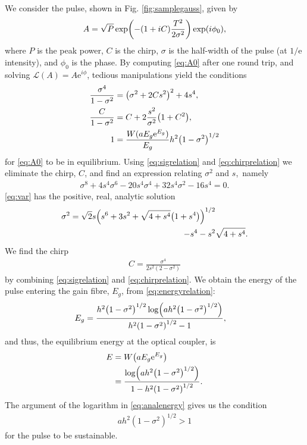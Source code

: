 \documentclass[9pt,twocolumn,twoside]{osajnl}
\let\originalleft\left
\let\originalright\right
\renewcommand{\left}{\mathopen{}\mathclose\bgroup\originalleft}
\renewcommand{\right}{\aftergroup\egroup\originalright}
\begin{document}
We consider the pulse, shown in Fig. \ref{fig:samplegauss}, given by
\begin{align}
	A = \sqrt{P} \exp \left( -(1 + iC) \frac{T^2}{2 \sigma^2} \right) \exp(i \phi_0),
	\label{eq:A0}
\end{align}
where $P$ is the peak power, $C$ is the chirp, $\sigma$ is the half-width of the pulse (at $1 / \textrm{e}$ intensity), and $\phi_0$ is the phase. By computing \eqref{eq:A0} after one round trip, and solving $\mathcal{L}(A) = A \textrm{e}^{i \phi}$, tedious manipulations yield the conditions
\begin{align}
	\frac{\sigma^4}{1 - \sigma^2} &= \left( \sigma^2 + 2 C s^2 \right)^2 + 4 s^4, \label{eq:sigrelation} \\
	\frac{C}{1 - \sigma^2} &= C + 2 \frac{s^2}{\sigma^2} \left( 1 + C^2 \right), \label{eq:chirprelation} \\
	1 &= \frac{W(a E_g \textrm{e}^{E_g})}{E_g} h^2 \left( 1 - \sigma^2 \right)^{1/2} \label{eq:energyrelation}
\end{align}
for \eqref{eq:A0} to be in equilibrium. Using \eqref{eq:sigrelation} and \eqref{eq:chirprelation} we eliminate the chirp, $C$, and find an expression relating $\sigma^2$ and $s$,~namely
\begin{align}
	\sigma^8 + 4 s^4 \sigma^6 - 20 s^4 \sigma^4 + 32 s^4 \sigma^2 - 16 s^4 = 0.
	\label{eq:var}
\end{align}
\eqref{eq:var} has the positive, real, analytic solution
\begin{equation}
	\begin{split}
		\sigma^2 = \sqrt{2} s \left( s^6 + 3s^2 + \sqrt{4 + s^4} \left( 1 + s^4 \right) \right)^{1/2} & \\
		- s^4 - s^2 & \sqrt{4 + s^4}.
		\label{eq:equilvar}
	\end{split}
\end{equation}
We find the chirp
\begin{align}
	C = \frac{\sigma^4}{2 s^2 (2 - \sigma^2)}
	\label{eq:chirp}
\end{align}
by combining \eqref{eq:sigrelation} and \eqref{eq:chirprelation}. We obtain the energy of the pulse entering the gain fibre, $E_g$, from \eqref{eq:energyrelation}:
\begin{align}
	E_g &= \frac{h^2 \left( 1 - \sigma^2 \right)^{1/2} \log \left( a h^2 \left( 1 - \sigma^2 \right)^{1/2} \right)}{h^2 \left( 1 - \sigma^2 \right)^{1/2} - 1},
\end{align}
and thus, the equilibrium energy at the optical coupler, is
\begin{align}
	E &= W \left( a E_g \textrm{e}^{E_g} \right) \\
	&= \frac{\log \left( a h^2 \left( 1 - \sigma^2 \right)^{1/2} \right)}{1 - h^2 \left( 1 - \sigma^2 \right)^{1/2}}.
	\label{eq:analenergy}
\end{align}
The argument of the logarithm in \eqref{eq:analenergy} gives us the condition
\begin{align}
	a h^2 (1 - \sigma^2)^{1/2} > 1
	\label{eq:energycond}
\end{align}
for the pulse to be sustainable.
\end{document}
